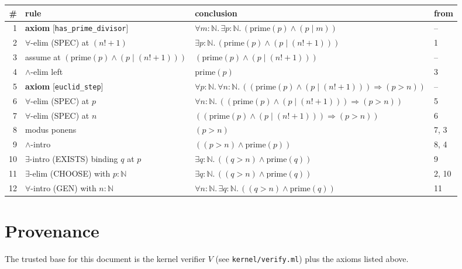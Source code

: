 \documentclass[11pt]{article}
\newcommand{\stepid}[1]{{\color{gray}\scriptsize #1}}
\begin{document}
\begin{longtable}{rlp{6.5cm}l}
\textbf{\#} & \textbf{rule} & \textbf{conclusion} & \textbf{from} \\
\hline
\stepid{1} & \textbf{axiom} [\texttt{has\_prime\_divisor}] & $\forall m\!:\!\mathbb{N}.\, \exists p\!:\!\mathbb{N}.\, (\mathrm{prime}(p) \wedge (p \mid m))$ & -- \\
\stepid{2} & $\forall$-elim (SPEC) at $(n! + 1)$ & $\exists p\!:\!\mathbb{N}.\, (\mathrm{prime}(p) \wedge (p \mid (n! + 1)))$ & 1 \\
\stepid{3} & assume at $(\mathrm{prime}(p) \wedge (p \mid (n! + 1)))$ & $(\mathrm{prime}(p) \wedge (p \mid (n! + 1)))$ & -- \\
\stepid{4} & $\wedge$-elim left & $\mathrm{prime}(p)$ & 3 \\
\stepid{5} & \textbf{axiom} [\texttt{euclid\_step}] & $\forall p\!:\!\mathbb{N}.\, \forall n\!:\!\mathbb{N}.\, ((\mathrm{prime}(p) \wedge (p \mid (n! + 1))) \Rightarrow (p > n))$ & -- \\
\stepid{6} & $\forall$-elim (SPEC) at $p$ & $\forall n\!:\!\mathbb{N}.\, ((\mathrm{prime}(p) \wedge (p \mid (n! + 1))) \Rightarrow (p > n))$ & 5 \\
\stepid{7} & $\forall$-elim (SPEC) at $n$ & $((\mathrm{prime}(p) \wedge (p \mid (n! + 1))) \Rightarrow (p > n))$ & 6 \\
\stepid{8} & modus ponens & $(p > n)$ & 7, 3 \\
\stepid{9} & $\wedge$-intro & $((p > n) \wedge \mathrm{prime}(p))$ & 8, 4 \\
\stepid{10} & $\exists$-intro (EXISTS) binding $q$ at $p$ & $\exists q\!:\!\mathbb{N}.\, ((q > n) \wedge \mathrm{prime}(q))$ & 9 \\
\stepid{11} & $\exists$-elim (CHOOSE) with $p\!:\!\mathbb{N}$ & $\exists q\!:\!\mathbb{N}.\, ((q > n) \wedge \mathrm{prime}(q))$ & 2, 10 \\
\stepid{12} & $\forall$-intro (GEN) with $n\!:\!\mathbb{N}$ & $\forall n\!:\!\mathbb{N}.\, \exists q\!:\!\mathbb{N}.\, ((q > n) \wedge \mathrm{prime}(q))$ & 11 \\
\end{longtable}

\section*{Provenance}
The trusted base for this document is the kernel verifier $V$ (see \texttt{kernel/verify.ml}) plus the axioms listed above.
\end{document}
